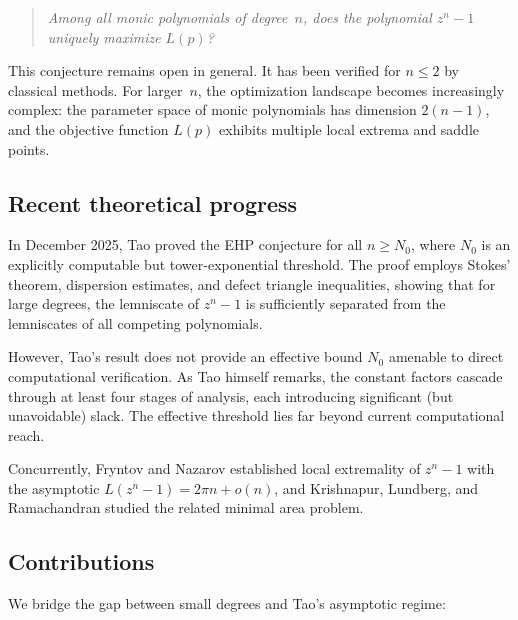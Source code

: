 \documentclass[11pt]{article}
\theoremstyle{plain}
\theoremstyle{definition}
\theoremstyle{remark}
\begin{document}
\begin{quote}
\emph{Among all monic polynomials of degree~$n$, does the polynomial $z^n - 1$ uniquely maximize $L(p)$?}
\end{quote}

This conjecture remains open in general. It has been verified for $n \leq 2$ by classical methods. For larger~$n$, the optimization landscape becomes increasingly complex: the parameter space of monic polynomials has dimension $2(n-1)$, and the objective function $L(p)$ exhibits multiple local extrema and saddle points.

\subsection{Recent theoretical progress}

In December 2025, Tao \cite{Tao2025} proved the EHP conjecture for all $n \geq N_0$, where $N_0$ is an explicitly computable but tower-exponential threshold. The proof employs Stokes' theorem, dispersion estimates, and defect triangle inequalities, showing that for large degrees, the lemniscate of $z^n - 1$ is sufficiently separated from the lemniscates of all competing polynomials.

However, Tao's result does not provide an effective bound $N_0$ amenable to direct computational verification. As Tao himself remarks, the constant factors cascade through at least four stages of analysis, each introducing significant (but unavoidable) slack. The effective threshold lies far beyond current computational reach.

Concurrently, Fryntov and Nazarov \cite{FN2025} established local extremality of $z^n - 1$ with the asymptotic $L(z^n - 1) = 2\pi n + o(n)$, and Krishnapur, Lundberg, and Ramachandran \cite{KLR2025} studied the related minimal area problem.

\subsection{Contributions}

We bridge the gap between small degrees and Tao's asymptotic regime:
\end{document}
